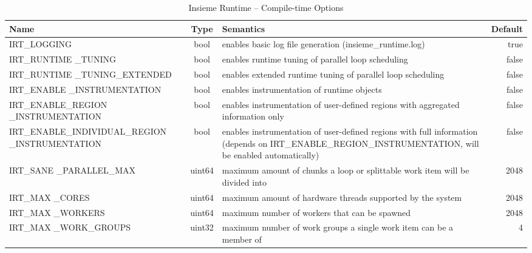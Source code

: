 \begin{table}[htbp] \small
	\centering
    \begin{tabular}{|p{4cm}|c|p{6cm}|r|}
        \hline
        Name                              & Type   & Semantics                                                                      & Default \\ \hline \hline
        IRT\_LOGGING                       & bool   & enables basic log file generation (insieme\_runtime.log)                                                                & true          \\ \hline
        IRT\_RUNTIME \_TUNING                & bool   & enables runtime tuning of parallel loop scheduling                                                                     & false         \\ \hline
        IRT\_RUNTIME \_TUNING\_EXTENDED       & bool   & enables extended runtime tuning of parallel loop scheduling                                                            & false         \\ \hline
        IRT\_ENABLE \_INSTRUMENTATION        & bool   & enables instrumentation of runtime objects                                                                             & false         \\ \hline
        IRT\_ENABLE\_REGION \_INSTRUMENTATION & bool   & enables instrumentation
	of user-defined regions	with aggregated information only			& false         \\ \hline
        IRT\_ENABLE\_INDIVIDUAL\_REGION \_INSTRUMENTATION & bool   & enables
	instrumentation of user-defined regions with full information (depends on IRT\_ENABLE\_REGION\_INSTRUMENTATION, will be enabled automatically) & false         \\ \hline
        IRT\_SANE \_PARALLEL\_MAX             & uint64 & maximum amount of chunks a loop or splittable work item will be divided into                                           & 2048          \\ \hline
        IRT\_MAX \_CORES                     & uint64 & maximum amount of hardware threads supported by the system                                                             & 2048          \\ \hline
        IRT\_MAX \_WORKERS                   & uint64 & maximum number of workers that can be spawned                                                                          & 2048          \\ \hline
        IRT\_MAX \_WORK\_GROUPS               & uint32 & maximum number of work groups a single work item can be a member of                                                    & 4             \\ \hline
  \end{tabular}
	\caption{Insieme Runtime -- Compile-time Options}
	\label{tab:runtime:options:compile}
\end{table}

